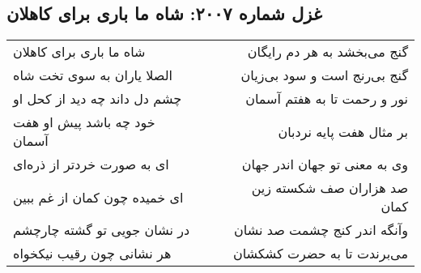 \begin{center}
\section*{غزل شماره ۲۰۰۷: شاه ما باری برای کاهلان}
\label{sec:2007}
\begin{longtable}{l p{0.5cm} r}
شاه ما باری برای کاهلان
&&
گنج می‌بخشد به هر دم رایگان
\\
الصلا یاران به سوی تخت شاه
&&
گنج بی‌رنج است و سود بی‌زیان
\\
چشم دل داند چه دید از کحل او
&&
نور و رحمت تا به هفتم آسمان
\\
خود چه باشد پیش او هفت آسمان
&&
بر مثال هفت پایه نردبان
\\
ای به صورت خردتر از ذره‌ای
&&
وی به معنی تو جهان اندر جهان
\\
ای خمیده چون کمان از غم ببین
&&
صد هزاران صف شکسته زین کمان
\\
در نشان جویی تو گشته چارچشم
&&
وآنگه اندر کنج چشمت صد نشان
\\
هر نشانی چون رقیب نیکخواه
&&
می‌برندت تا به حضرت کشکشان
\\
\end{longtable}
\end{center}
